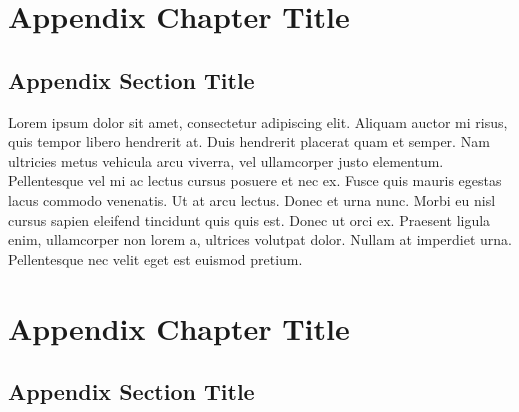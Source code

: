 \documentclass[
	11pt, %
	fleqn, %
	a4paper, %
]{LegrandOrangeBook}
\begin{document}

\chapterspaceabove{6.75cm} %
\chapterspacebelow{7.25cm} %

\begin{appendices}

\renewcommand{\chaptername}{Appendix} %


\chapter{Appendix Chapter Title}

\section{Appendix Section Title}

Lorem ipsum dolor sit amet, consectetur adipiscing elit. Aliquam auctor mi risus, quis tempor libero hendrerit at. Duis hendrerit placerat quam et semper. Nam ultricies metus vehicula arcu viverra, vel ullamcorper justo elementum. Pellentesque vel mi ac lectus cursus posuere et nec ex. Fusce quis mauris egestas lacus commodo venenatis. Ut at arcu lectus. Donec et urna nunc. Morbi eu nisl cursus sapien eleifend tincidunt quis quis est. Donec ut orci ex. Praesent ligula enim, ullamcorper non lorem a, ultrices volutpat dolor. Nullam at imperdiet urna. Pellentesque nec velit eget est euismod pretium.


\chapter{Appendix Chapter Title}

\section{Appendix Section Title}


\end{appendices}
\end{document}

